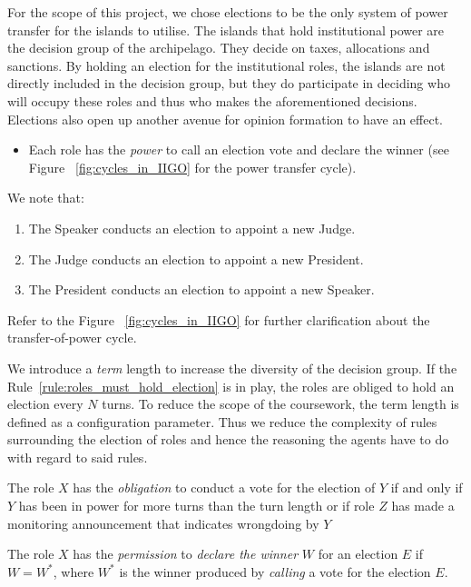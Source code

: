 For the scope of this project, we chose elections to be the only system of power transfer for the islands to utilise. The islands that hold institutional power are the decision group of the archipelago. They decide on taxes, allocations and sanctions. By holding an election for the institutional roles, the islands are not directly included in the decision group, but they do participate in deciding who will occupy these roles and thus who makes the aforementioned decisions. Elections also open up another avenue for opinion formation to have an effect.
\begin{itemize}
    \item Each role has the \emph{power} to call an election vote and declare the winner (see Figure~ \ref{fig:cycles_in_IIGO} for the power transfer cycle).
\end{itemize}

We note that:
\begin{enumerate}
    \item The Speaker conducts an election to appoint a new Judge.
    \item The Judge conducts an election to appoint a new President.
    \item The President conducts an election to appoint a new Speaker.
\end{enumerate}
Refer to the Figure~ \ref{fig:cycles_in_IIGO} for further clarification about the transfer-of-power cycle.

We introduce a \emph{term} length to increase the diversity of the decision group. If the Rule~\ref{rule:roles_must_hold_election} is in play, the roles are obliged to hold an election every $N$ turns. To reduce the scope of the coursework, the term length is defined as a configuration parameter. Thus we reduce the complexity of rules surrounding the election of roles and hence the reasoning the agents have to do with regard to said rules.

\begin{rule_IIGO} \label{rule:roles_must_hold_election}
    The role $X$ has the \emph{obligation} to conduct a vote for the election of $Y$ if and only if $Y$ has been in power for more turns than the turn length or if role $Z$ has made a monitoring announcement that indicates wrongdoing by $Y$
\end{rule_IIGO}

\begin{rule_IIGO} \label{rule:must_appoint_elected_island}
    The role $X$ has the \emph{permission} to \emph{declare the winner} $W$ for an election $E$ if $W = W^{*}$, where $W^{*}$ is the winner produced by \emph{calling} a vote for the election $E$.
\end {rule_IIGO}

